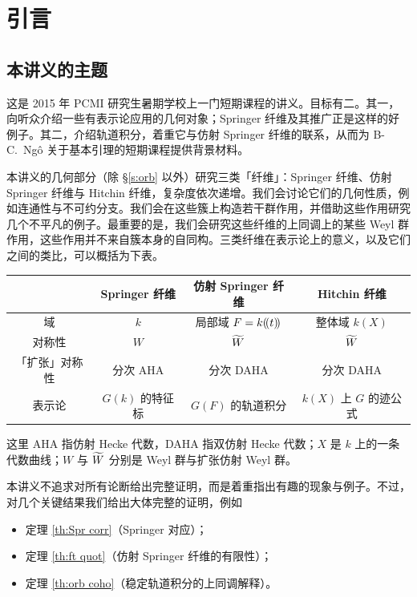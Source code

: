 \section{引言}

\subsection{本讲义的主题} 这是 2015 年 PCMI 研究生暑期学校上一门短期课程的讲义。目标有二。其一，向听众介绍一些有表示论应用的几何对象；Springer 纤维及其推广正是这样的好例子。其二，介绍轨道积分，着重它与仿射 Springer 纤维的联系，从而为 B-C.~Ng\^o 关于基本引理的短期课程提供背景材料。

本讲义的几何部分（除 \S\ref{s:orb} 以外）研究三类「纤维」：Springer 纤维、仿射 Springer 纤维与 Hitchin 纤维，复杂度依次递增。我们会讨论它们的几何性质，例如连通性与不可约分支。我们会在这些簇上构造若干群作用，并借助这些作用研究几个不平凡的例子。最重要的是，我们会研究这些纤维的上同调上的某些 Weyl 群作用，这些作用并不来自簇本身的自同构。三类纤维在表示论上的意义，以及它们之间的类比，可以概括为下表。

\begin{table}[htbp]
\centering
\begin{tabular}{|c|c|c|c|}
\hline
 & Springer 纤维 & 仿射 Springer 纤维 & Hitchin 纤维\\
\hline
域 & $k$ & 局部域 $F=k(\!(t)\!)$ & 整体域 $k(X)$\\
\hline
对称性 & $W$ & $\widetilde{W}$ & $\widetilde{W}$\\
\hline
「扩张」对称性 & 分次 AHA & 分次 DAHA & 分次 DAHA\\
\hline
表示论 & $G(k)$ 的特征标 & $G(F)$ 的轨道积分 & $k(X)$ 上 $G$ 的迹公式\\
\hline
\end{tabular}
\end{table}

这里 AHA 指仿射 Hecke 代数，DAHA 指双仿射 Hecke 代数；$X$ 是 $k$ 上的一条代数曲线；$W$ 与 $\widetilde{W}$ 分别是 Weyl 群与扩张仿射 Weyl 群。

本讲义不追求对所有论断给出完整证明，而是着重指出有趣的现象与例子。不过，对几个关键结果我们给出大体完整的证明，例如
\begin{itemize}
\item 定理 \ref{th:Spr corr}（Springer 对应）；
\item 定理 \ref{th:ft quot}（仿射 Springer 纤维的有限性）；
\item 定理 \ref{th:orb coho}（稳定轨道积分的上同调解释）。
\end{itemize}

